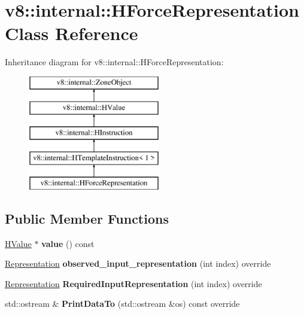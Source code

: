 \hypertarget{classv8_1_1internal_1_1_h_force_representation}{}\section{v8\+:\+:internal\+:\+:H\+Force\+Representation Class Reference}
\label{classv8_1_1internal_1_1_h_force_representation}
Inheritance diagram for v8\+:\+:internal\+:\+:H\+Force\+Representation\+:\begin{figure}[H]
\begin{center}
\leavevmode
\includegraphics[height=5.000000cm]{classv8_1_1internal_1_1_h_force_representation}
\end{center}
\end{figure}
\subsection*{Public Member Functions}
\begin{DoxyCompactItemize}
\item 
\hyperlink{classv8_1_1internal_1_1_h_value}{H\+Value} $\ast$ {\bfseries value} () const \hypertarget{classv8_1_1internal_1_1_h_force_representation_a08f7c52977143024c0034d00525d5d1a}{}\label{classv8_1_1internal_1_1_h_force_representation_a08f7c52977143024c0034d00525d5d1a}

\item 
\hyperlink{classv8_1_1internal_1_1_representation}{Representation} {\bfseries observed\+\_\+input\+\_\+representation} (int index) override\hypertarget{classv8_1_1internal_1_1_h_force_representation_a3cc56d8171f3f229e31b920e9a66474c}{}\label{classv8_1_1internal_1_1_h_force_representation_a3cc56d8171f3f229e31b920e9a66474c}

\item 
\hyperlink{classv8_1_1internal_1_1_representation}{Representation} {\bfseries Required\+Input\+Representation} (int index) override\hypertarget{classv8_1_1internal_1_1_h_force_representation_aebf5607df3afd6794b5331181abbadd7}{}\label{classv8_1_1internal_1_1_h_force_representation_aebf5607df3afd6794b5331181abbadd7}

\item 
std\+::ostream \& {\bfseries Print\+Data\+To} (std\+::ostream \&os) const  override\hypertarget{classv8_1_1internal_1_1_h_force_representation_a37d36b026764c5e92b2f3367f4a947df}{}\label{classv8_1_1internal_1_1_h_force_representation_a37d36b026764c5e92b2f3367f4a947df}

\end{DoxyCompactItemize}
